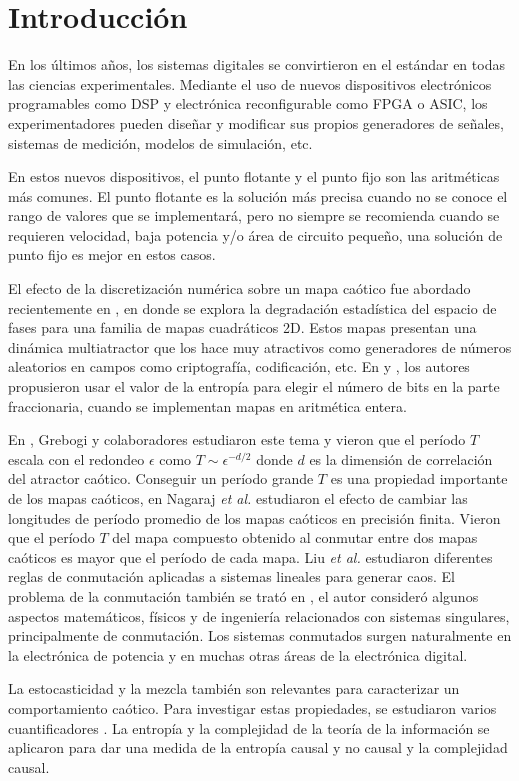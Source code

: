 \section{Introducción}

En los últimos años, los sistemas digitales se convirtieron en el estándar en todas las ciencias experimentales.
Mediante el uso de nuevos dispositivos electrónicos programables como DSP y electrónica reconfigurable como FPGA o ASIC, los experimentadores pueden diseñar y modificar sus propios generadores de señales, sistemas de medición, modelos de simulación, etc.

En estos nuevos dispositivos, el punto flotante y el punto fijo son las aritméticas más comunes.
El punto flotante es la solución más precisa cuando no se conoce el rango de valores que se implementará, pero no siempre se recomienda cuando se requieren velocidad, baja potencia y/o área de circuito pequeño, una solución de punto fijo es mejor en estos casos.

El efecto de la discretización numérica sobre un mapa caótico fue abordado recientemente en \cite{DeMicco2017}, en donde se explora la degradación estadística del espacio de fases para una familia de mapas cuadráticos 2D.
Estos mapas presentan una dinámica multiatractor que los hace muy atractivos como generadores de números aleatorios en campos como criptografía, codificación, etc. En \cite{Tlelo-Cuautle2016} y \cite{DelaFraga2017}, los autores propusieron usar el valor de la entropía para elegir el número de bits en la parte fraccionaria, cuando se implementan mapas en aritmética entera.

En \cite{Grebogi1988}, Grebogi y colaboradores estudiaron este tema y vieron que el período $T$ escala con el redondeo $\epsilon$ como $T\sim\epsilon^{-d/2}$ donde $d$ es la dimensión de correlación del atractor caótico.
Conseguir un período grande $T$ es una propiedad importante de los mapas caóticos, en \cite{Nagaraj2008} Nagaraj \textit{et al.} estudiaron el efecto de cambiar las longitudes de período promedio de los mapas caóticos en precisión finita.
Vieron que el período $T$ del mapa compuesto obtenido al conmutar entre dos mapas caóticos es mayor que el período de cada mapa.
Liu \textit{et al.} \cite{Liu2006} estudiaron diferentes reglas de conmutación aplicadas a sistemas lineales para generar caos.
El problema de la conmutación también se trató en \cite{Gluskin2008}, el autor consideró algunos aspectos matemáticos, físicos y de ingeniería relacionados con sistemas singulares, principalmente de conmutación.
Los sistemas conmutados surgen naturalmente en la electrónica de potencia y en muchas otras áreas de la electrónica digital.

La estocasticidad y la mezcla también son relevantes para caracterizar un comportamiento caótico.
Para investigar estas propiedades, se estudiaron varios cuantificadores \cite{DeMicco2009}.
La entropía y la complejidad de la teoría de la información se aplicaron para dar una medida de la entropía causal y no causal y la complejidad causal.
